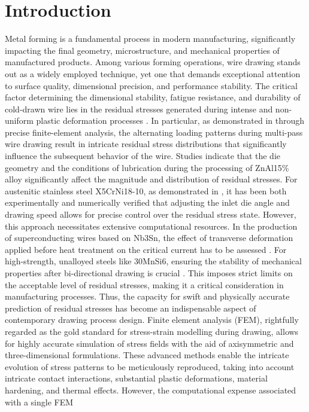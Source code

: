 \documentclass[subscriptcorrection,upint,varvw,barcolor=Goldenrod3,mathalfa=cal=euler,balance,hyphenate,french,pdf-a]{asmejour} %
\begin{document}

\section{Introduction}

Metal forming is a fundamental process in modern manufacturing, significantly impacting the final geometry, microstructure, and mechanical properties of manufactured products. Among various forming operations, wire drawing stands out as a widely employed technique, yet one that demands exceptional attention to surface quality, dimensional precision, and performance stability.
The critical factor determining the dimensional stability, fatigue resistance, and durability of cold-drawn wire lies in the residual stresses generated during intense and non-uniform plastic deformation processes \citep{burioli2024novel,lim2026study,shin2026accurate,delrey2025effect,delrey2026advances,he2003residual,overstam2006influence,aghdami2020inverse,radionova2022fem, selbmann2024residual, suliga2024influence, ruminski2025effect}. In particular, as demonstrated in \citep{shin2026accurate} through precise finite-element analysis, the alternating loading patterns during multi-pass wire drawing result in intricate residual stress distributions that significantly influence the subsequent behavior of the wire. Studies \citep{delrey2025effect, delrey2026advances} indicate that the die geometry and the conditions of lubrication during the processing of ZnAl15\% alloy significantly affect the magnitude and distribution of residual stresses. For austenitic stainless steel X5CrNi18-10, as demonstrated in \citep{selbmann2024residual}, it has been both experimentally and numerically verified that adjusting the inlet die angle and drawing speed allows for precise control over the residual stress state. However, this approach necessitates extensive computational resources. In the production of superconducting wires based on Nb3Sn, the effect of transverse deformation applied before heat treatment on the critical current has to be assessed \citep{burioli2024novel}. For high-strength, unalloyed steels like 30MnSi6, ensuring the stability of mechanical properties after bi-directional drawing is crucial \citep{lim2026study}. This imposes strict limits on the acceptable level of residual stresses, making it a critical consideration in manufacturing processes. Thus, the capacity for swift and physically accurate prediction of residual stresses has become an indispensable aspect of contemporary drawing process design. Finite element analysis (FEM), rightfully regarded as the gold standard for stress-strain modelling during drawing, allows for highly accurate simulation of stress fields with the aid of axisymmetric and three-dimensional formulations. These advanced methods enable the intricate evolution of stress patterns to be meticulously reproduced, taking into account intricate contact interactions, substantial plastic deformations, material hardening, and thermal effects. However, the computational expense associated with a single FEM 
\end{document}

